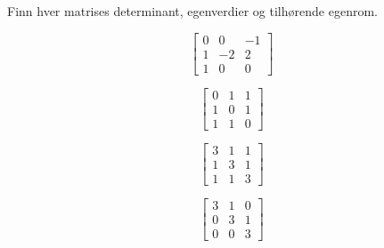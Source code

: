 \begin{oppgave}
Finn hver matrises determinant, egenverdier og tilhørende egenrom. 
\begin{punkt}
\[
\begin{bmatrix}
0 & 0 & -1 \\ 1 & -2 & 2 \\ 1 & 0 & 0 
\end{bmatrix}
\]
\end{punkt}

\begin{punkt}
\[
\begin{bmatrix}
0 & 1 & 1 \\ 1 & 0 & 1 \\ 1 & 1 & 0 
\end{bmatrix}
\]
\end{punkt}


\begin{punkt}
\[
\begin{bmatrix}
3 & 1 & 1 \\ 1 & 3 & 1 \\ 1 & 1 & 3 
\end{bmatrix}
\]
\end{punkt}

\begin{punkt}
\[
\begin{bmatrix}
3 & 1 & 0 \\ 0 & 3 & 1 \\ 0 & 0 & 3 
\end{bmatrix}
\]
\end{punkt}

\end{oppgave}


